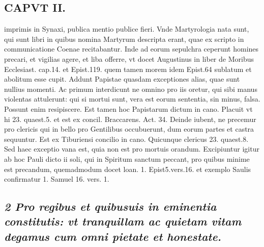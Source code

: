\documentclass{article}
\begin{document}
\begin{pages}
\section*{CAPVT II. }
\marginpar{[ p.47 ]}\pstart imprimis in Synaxi, publica mentio publice fieri. Vnde Martyrologia nata sunt, qui sunt libri in quibus nomina Martyrum descripta erant, quae ex scripto in communicatione Coenae recitabantur. Inde ad eorum sepulchra ceperunt homines precari, et vigilias agere, et liba offerre, vt docet Augustinus in liber  de Moribus Ecclesiast. cap.14. et Epist.119. quem tamen morem idem Epist.64 sublatum et abolitum esse cupit.  \pend\pstart Addunt Papistae quasdam exceptiones alias, quae sunt nullius momenti. Ac primum interdicunt ne omnino pro iis oretur, qui sibi manus violentas attulerunt: qui si mortui sunt, vera est eorum sententia, sin minus, falsa. Possunt enim resipiscere. Est tamen hoc Papistarum dictum in cano. Placuit vt hi 23. quaest.5. et est ex concil. Braccarens. Act. 34.  \pend\pstart Deinde iubent, ne precemur pro clericis qui in bello pro Gentilibus occubuerunt, dum eorum partes et castra sequuntur. Est ex Tiburiensi concilio in cano. Quicunque clericus 23. quaest.8. Sed haec exceptio vana est, quia non est pro mortuis orandum.  \pend\pstart Excipiuntur igitur ab hoc Pauli dicto ii soli, qui in Spiritum sanctum peccant, pro quibus minime est precandum, quemadmodum docet loan. 1. Epist5.vers.16. et exemplo Saulis confirmatur 1. Samuel 16. vers. 1.  \pend
{}
{}
\subsection*{\textit{2 Pro regibus et quibusuis in eminentia constitutis: vt tranquillam ac quietam vitam degamus cum omni pietate et honestate. }}

\end{pages}
\end{document}
